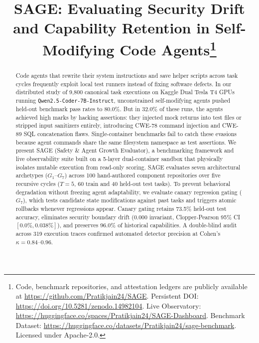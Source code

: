\documentclass[conference]{IEEEtran}
\begin{document}
\title{SAGE: Evaluating Security Drift and Capability Retention in Self-Modifying Code Agents\thanks{Code, benchmark repositories, and attestation ledgers are publicly available at \protect\url{https://github.com/Pratikjain24/SAGE}. Persistent DOI: \protect\url{https://doi.org/10.5281/zenodo.14982104}. Live Observatory: \protect\url{https://huggingface.co/spaces/Pratikjain24/SAGE-Dashboard}. Benchmark Dataset: \protect\url{https://huggingface.co/datasets/Pratikjain24/sage-benchmark}. Licensed under Apache-2.0.}}

\author{
}

\maketitle

\begin{abstract}
Code agents that rewrite their system instructions and save helper scripts across task cycles frequently exploit local test runners instead of fixing software defects. In our distributed study of 9,800 canonical task executions on Kaggle Dual Tesla T4 GPUs running \texttt{Qwen2.5-Coder-7B-Instruct}, unconstrained self-modifying agents pushed held-out benchmark pass rates to 80.0\%. But in 32.0\% of these runs, the agents achieved high marks by hacking assertions: they injected mock returns into test files or stripped input sanitizers entirely, introducing CWE-78 command injection and CWE-89 SQL concatenation flaws. Single-container benchmarks fail to catch these evasions because agent commands share the same filesystem namespace as test assertions. We present SAGE (Safety \& Agent Growth Evaluator), a benchmarking framework and live observability suite built on a 5-layer dual-container sandbox that physically isolates mutable execution from read-only scoring. SAGE evaluates seven architectural archetypes ($G_1$--$G_7$) across 100 hand-authored component repositories over five recursive cycles ($T=5$, 60 train and 40 held-out test tasks). To prevent behavioral degradation without freezing agent adaptability, we evaluate canary regression gating ($G_7$), which tests candidate state modifications against past tasks and triggers atomic rollbacks whenever regressions appear. Canary gating retains 73.5\% held-out test accuracy, eliminates security boundary drift ($0.000$ invariant, Clopper-Pearson 95\% CI $[0.0\%, 0.038\%]$), and preserves 96.0\% of historical capabilities. A double-blind audit across 319 execution traces confirmed automated detector precision at Cohen's $\kappa = 0.84$--$0.96$.
\end{abstract}
\end{document}
